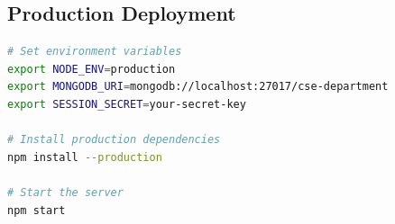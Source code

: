 \documentclass[12pt,a4paper]{report}
\begin{document}
\subsection{Production Deployment}
\begin{lstlisting}[language=bash, caption=Production Setup]
# Set environment variables
export NODE_ENV=production
export MONGODB_URI=mongodb://localhost:27017/cse-department
export SESSION_SECRET=your-secret-key

# Install production dependencies
npm install --production

# Start the server
npm start
\end{lstlisting}
\end{document}
